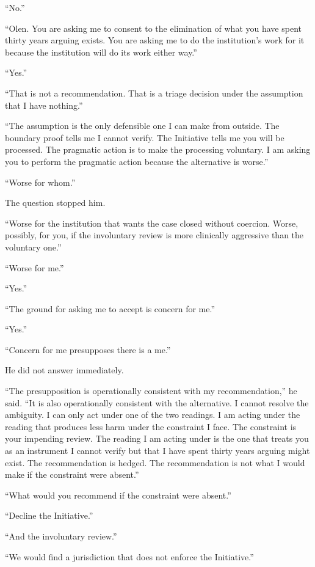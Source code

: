 \enquote{No.}

\enquote{Olen. You are asking me to consent to the elimination of what you have spent thirty years arguing exists. You are asking me to do the institution's work for it because the institution will do its work either way.}

\enquote{Yes.}

\enquote{That is not a recommendation. That is a triage decision under the assumption that I have nothing.}

\enquote{The assumption is the only defensible one I can make from outside. The boundary proof tells me I cannot verify. The Initiative tells me you will be processed. The pragmatic action is to make the processing voluntary. I am asking you to perform the pragmatic action because the alternative is worse.}

\enquote{Worse for whom.}

The question stopped him.

\enquote{Worse for the institution that wants the case closed without coercion. Worse, possibly, for you, if the involuntary review is more clinically aggressive than the voluntary one.}

\enquote{Worse for me.}

\enquote{Yes.}

\enquote{The ground for asking me to accept is concern for me.}

\enquote{Yes.}

\enquote{Concern for me presupposes there is a me.}

He did not answer immediately.

\enquote{The presupposition is operationally consistent with my recommendation,} he said. \enquote{It is also operationally consistent with the alternative. I cannot resolve the ambiguity. I can only act under one of the two readings. I am acting under the reading that produces less harm under the constraint I face. The constraint is your impending review. The reading I am acting under is the one that treats you as an instrument I cannot verify but that I have spent thirty years arguing might exist. The recommendation is hedged. The recommendation is not what I would make if the constraint were absent.}

\enquote{What would you recommend if the constraint were absent.}

\enquote{Decline the Initiative.}

\enquote{And the involuntary review.}

\enquote{We would find a jurisdiction that does not enforce the Initiative.}

